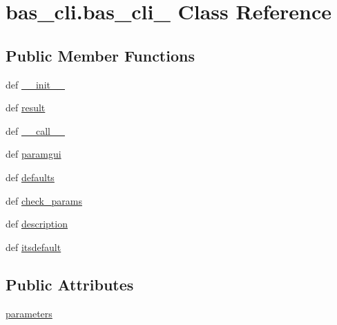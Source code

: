 \hypertarget{classbas__cli_1_1bas__cli__}{\section{bas\-\_\-cli.\-bas\-\_\-cli\-\_\- \-Class \-Reference}
\label{classbas__cli_1_1bas__cli__}
}
\subsection*{\-Public \-Member \-Functions}
\begin{DoxyCompactItemize}
\item 
def \hyperlink{classbas__cli_1_1bas__cli___aee4e27690a8a56bf253335271a2a7feb}{\-\_\-\-\_\-init\-\_\-\-\_\-}
\item 
def \hyperlink{classbas__cli_1_1bas__cli___a59038f30bbb767f38f8b2d7e203e5889}{result}
\item 
def \hyperlink{classbas__cli_1_1bas__cli___a363614576f170cc524d4931910661d1c}{\-\_\-\-\_\-call\-\_\-\-\_\-}
\item 
def \hyperlink{classbas__cli_1_1bas__cli___aee0e6e55ab4e99b7b55dbb1be63ec129}{paramgui}
\item 
def \hyperlink{classbas__cli_1_1bas__cli___a8e3a35536968e739ebe4eefe09cc65a5}{defaults}
\item 
def \hyperlink{classbas__cli_1_1bas__cli___a529efc3c6e3e3f3a4ac1088775c22fb3}{check\-\_\-params}
\item 
def \hyperlink{classbas__cli_1_1bas__cli___a6476aee512532590690c7865d4ff1a1b}{description}
\item 
def \hyperlink{classbas__cli_1_1bas__cli___a98c94d3813075a22a274652ed2e0e4ee}{itsdefault}
\end{DoxyCompactItemize}
\subsection*{\-Public \-Attributes}
\begin{DoxyCompactItemize}
\item 
\hyperlink{classbas__cli_1_1bas__cli___a1961628515a0b77eb27e93c853d64a8f}{parameters}
\end{DoxyCompactItemize}
